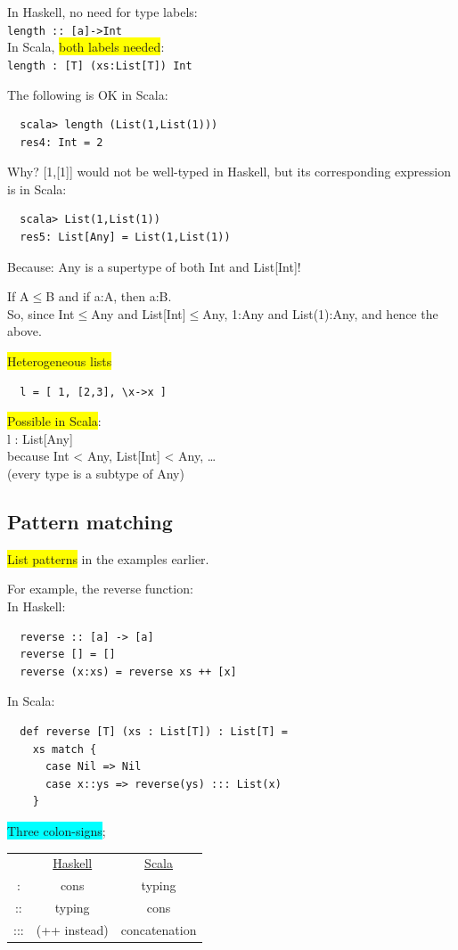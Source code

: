 \documentclass[tikz,border=10pt]{project_plan}
\begin{document}
In Haskell, no need for type labels:\\
\lstinline?length :: [a]->Int?\\
In Scala, \colorbox{yellow}{both labels needed}:\\
\lstinline?length : [T] (xs:List[T]) Int?

The following is OK in Scala:
\begin{lstlisting}
  scala> length (List(1,List(1)))
  res4: Int = 2
\end{lstlisting}
Why? [1,[1]] would not be well-typed in Haskell, but
its corresponding expression is in Scala:
\begin{lstlisting}
  scala> List(1,List(1))
  res5: List[Any] = List(1,List(1))
\end{lstlisting}
Because: Any is a supertype of both Int and List[Int]!

If A$\leq$B and if a:A, then a:B.\\
So, since Int$\leq$Any and List[Int]$\leq$Any, 1:Any and
List(1):Any, and hence the above.

\colorbox{yellow}{Heterogeneous lists}\\
\begin{lstlisting}
  l = [ 1, [2,3], \x->x ]
\end{lstlisting}
\colorbox{yellow}{Possible in Scala}:\\
l : List[Any]\\
because Int < Any, List[Int] < Any, …\\
(every type is a subtype of Any)

\subsection{Pattern matching}

\colorbox{yellow}{List patterns} in the examples earlier.

For example, the reverse function:\\
In Haskell:
\begin{lstlisting}
  reverse :: [a] -> [a]
  reverse [] = []
  reverse (x:xs) = reverse xs ++ [x]
\end{lstlisting}
In Scala:
\begin{lstlisting}
  def reverse [T] (xs : List[T]) : List[T] =
    xs match {
      case Nil => Nil
      case x::ys => reverse(ys) ::: List(x)
    }
\end{lstlisting}

\colorbox{cyan}{Three colon-signs};\\
\begin{tabular}{c c c}
      & \underline{Haskell} & \underline{Scala} \\
  :   & cons                & typing            \\
  ::  & typing              & cons              \\
  ::: & (++ instead)        & concatenation     \\
\end{tabular}
\end{document}
